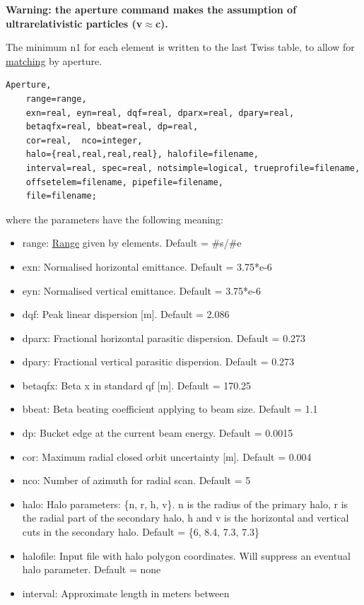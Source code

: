 {\bf Warning: the aperture command makes the assumption of ultrarelativistic
particles (v\(\approx\)c).}

The minimum n1 for each element is written to the last Twiss table, to
allow for \href{../match/match.html}{matching} by aperture.   
	
\begin{verbatim}
Aperture,
    range=range,
    exn=real, eyn=real, dqf=real, dparx=real, dpary=real, 
    betaqfx=real, bbeat=real, dp=real, 
    cor=real,  nco=integer, 
    halo={real,real,real,real}, halofile=filename,
    interval=real, spec=real, notsimple=logical, trueprofile=filename,
    offsetelem=filename, pipefile=filename, 
    file=filename;  
\end{verbatim} 
where the parameters have the following meaning: 
\begin{itemize}
   \item range: \href{../Introduction/ranges.html}{Range} given by
     elements. Default = \#s/\#e  
   \item exn: Normalised horizontal emittance. Default = 3.75*e-6  
   \item eyn: Normalised vertical emittance. Default = 3.75*e-6 
   \item dqf: Peak linear dispersion [m]. Default = 2.086 
   \item dparx: Fractional horizontal parasitic dispersion. Default = 0.273 
   \item dpary: Fractional vertical parasitic dispersion. Default = 0.273 
   \item betaqfx: Beta x in standard qf [m]. Default = 170.25 
   \item bbeat: Beta beating coefficient applying to beam size. Default = 1.1 
   \item dp: Bucket edge at the current beam energy. Default = 0.0015 
   \item cor: Maximum radial closed orbit uncertainty [m]. Default = 0.004 
   \item nco: Number of azimuth for radial scan. Default = 5 
   \item halo: Halo parameters: \{n, r, h, v\}. n is the radius of the
     primary halo,  r is the radial part of the secondary halo, h and v
     is the horizontal and  vertical cuts in the secondary halo. Default
     = \{6, 8.4, 7.3, 7.3\}  
   \item halofile: Input file with halo polygon coordinates. Will
     suppress  an eventual halo parameter. Default = none  
   \item interval: Approximate length in meters between

\end{itemize}
